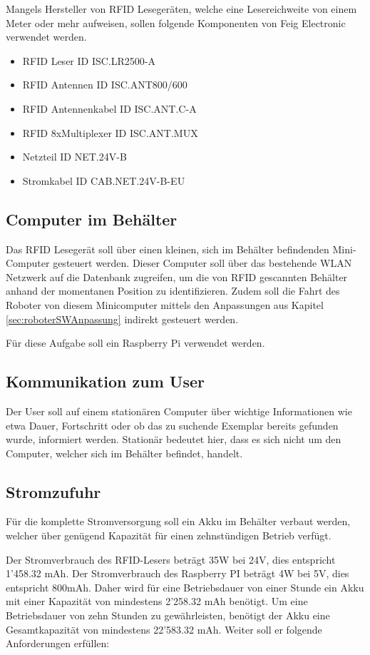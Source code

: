Mangels Hersteller von RFID Lesegeräten, welche eine Lesereichweite von einem Meter oder mehr aufweisen, sollen folgende Komponenten von Feig Electronic verwendet werden. 
\begin{itemize}
	\item RFID Leser ID ISC.LR2500-A
	\item RFID Antennen ID ISC.ANT800/600
	\item RFID Antennenkabel ID ISC.ANT.C-A
	\item RFID 8xMultiplexer ID ISC.ANT.MUX
	\item Netzteil ID NET.24V-B
	\item Stromkabel ID CAB.NET.24V-B-EU
\end{itemize}

\clearpage
\subsection{Computer im Behälter}
Das RFID Lesegerät soll über einen kleinen, sich im Behälter befindenden Mini-Computer gesteuert werden. Dieser Computer soll über das bestehende WLAN Netzwerk auf die Datenbank zugreifen, um die von RFID gescannten Behälter anhand der momentanen Position zu identifizieren.  
Zudem soll die Fahrt des Roboter von diesem Minicomputer mittels den Anpassungen aus Kapitel  \ref{sec:roboterSWAnpassung} indirekt gesteuert werden.

Für diese Aufgabe soll ein Raspberry Pi verwendet werden.

\subsection{Kommunikation zum User}
Der User soll auf einem stationären Computer über wichtige Informationen wie etwa Dauer, Fortschritt oder ob das zu suchende Exemplar bereits gefunden wurde, informiert werden. Stationär bedeutet hier, dass es sich nicht um den Computer, welcher sich im Behälter befindet, handelt.

\subsection{Stromzufuhr}
Für die komplette Stromversorgung soll ein Akku im Behälter verbaut werden, welcher über genügend Kapazität für einen zehnstündigen Betrieb verfügt.

Der Stromverbrauch des RFID-Lesers beträgt 35W bei 24V, dies entspricht 1'458.32 mAh.
Der Stromverbrauch des Raspberry PI beträgt 4W bei 5V, dies entspricht 800mAh.
Daher wird für eine Betriebsdauer von einer Stunde ein Akku mit einer Kapazität von mindestens 2'258.32 mAh benötigt. Um eine Betriebsdauer von zehn Stunden zu gewährleisten, benötigt der Akku eine Gesamtkapazität von mindestens 22'583.32 mAh.
Weiter soll er folgende Anforderungen erfüllen:

